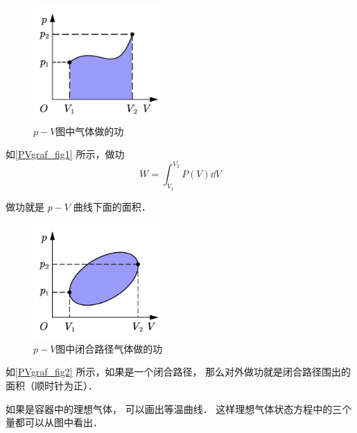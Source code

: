 

\begin{figure}[ht]
\centering
\includegraphics[width=5cm]{./figures/PVgraf_1.pdf}
\caption{$p-V$图中气体做的功} \label{PVgraf_fig1}
\end{figure}

如\autoref{PVgraf_fig1} 所示，做功
\begin{equation}\label{PVgraf_eq1}
W = \int_{V_1}^{V_2}P(V) \dd{V}
\end{equation}

做功就是 $p-V$ 曲线下面的面积． 

\begin{figure}[ht]  
\centering
\includegraphics[width=5cm]{./figures/PVgraf_2.pdf}
\caption{$p-V$图中闭合路径气体做的功} \label{PVgraf_fig2}
\end{figure}

如\autoref{PVgraf_fig2} 所示，如果是一个闭合路径， 那么对外做功就是闭合路径围出的面积（顺时针为正）．

如果是容器中的理想气体， 可以画出等温曲线． 这样理想气体状态方程中的三个量都可以从图中看出．
  